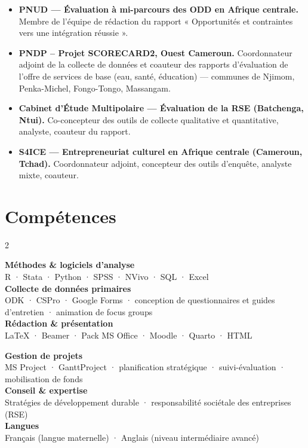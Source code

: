 \documentclass[
  french,
  10pt,
  letterpaper,
  DIV=11,
  numbers=noendperiod]{scrartcl}
\providecommand{\tightlist}{%
  \setlength{\itemsep}{0pt}\setlength{\parskip}{0pt}}
\begin{document}
\begin{itemize}
\tightlist
\item
  \textbf{PNUD --- Évaluation à mi-parcours des ODD en Afrique
  centrale.} Membre de l'équipe de rédaction du rapport « Opportunités
  et contraintes vers une intégration réussie ».
\item
  \textbf{PNDP -- Projet SCORECARD2, Ouest Cameroun.} Coordonnateur
  adjoint de la collecte de données et coauteur des rapports
  d'évaluation de l'offre de services de base (eau, santé, éducation)
  --- communes de Njimom, Penka-Michel, Fongo-Tongo, Massangam.
\item
  \textbf{Cabinet d'Étude Multipolaire --- Évaluation de la RSE
  (Batchenga, Ntui).} Co-concepteur des outils de collecte qualitative
  et quantitative, analyste, coauteur du rapport.
\item
  \textbf{S4ICE --- Entrepreneuriat culturel en Afrique centrale
  (Cameroun, Tchad).} Coordonnateur adjoint, concepteur des outils
  d'enquête, analyste mixte, coauteur.
\end{itemize}

\section{Compétences}\label{compuxe9tences}

\begin{paracol}{2}

\textbf{Méthodes \& logiciels d'analyse}\\
R · Stata · Python · SPSS · NVivo · SQL · Excel\\

\textbf{Collecte de données primaires}\\
ODK · CSPro · Google Forms · conception de questionnaires et guides d'entretien · animation de focus groups\\

\textbf{Rédaction \& présentation}\\
\LaTeX{} · Beamer · Pack MS Office · Moodle · Quarto · HTML

\switchcolumn

\textbf{Gestion de projets}\\
MS Project · GanttProject · planification stratégique · suivi-évaluation · mobilisation de fonds\\

\textbf{Conseil \& expertise}\\
Stratégies de développement durable · responsabilité sociétale des entreprises (RSE)\\

\textbf{Langues}\\
Français (langue maternelle) · Anglais (niveau intermédiaire avancé)

\end{paracol}
\end{document}
